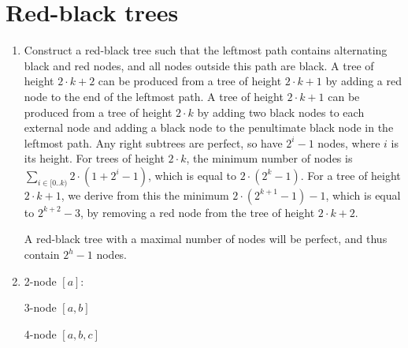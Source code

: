 \documentclass[11pt]{article}
\begin{document}
\section{Red-black trees}
\begin{enumerate}
\item Construct a red-black tree such that the leftmost path contains alternating black and red nodes, and all nodes outside this path are black. A tree of height \(2\cdot k+2\) can be produced from a tree of height \(2\cdot k+1\) by adding a red node to the end of the leftmost path. A tree of height \(2\cdot k+1\) can be produced from a tree of height \(2\cdot k\) by adding two black nodes to each external node and adding a black node to the penultimate black node in the leftmost path. Any right subtrees are perfect, so have \(2^i-1\) nodes, where \(i\) is its height. For trees of height \(2\cdot k\), the minimum number of nodes is \(\sum_{i\in[0..k)}2\cdot\left( 1+2^i-1 \right)\), which is equal to \(2\cdot\left( 2^k-1 \right)\). For a tree of height \(2\cdot k+1\), we derive from this the minimum \(2\cdot\left( 2^{k+1}-1 \right)-1\), which is equal to \(2^{k+2}-3\), by removing a red node from the tree of height \(2\cdot k+2\).

  A red-black tree with a maximal number of nodes will be perfect, and thus contain \(2^h-1\) nodes.
\item
  2-node \([a]\):


  3-node \([a,b]\)


  4-node \([a,b,c]\)

\end{enumerate}
\end{document}

